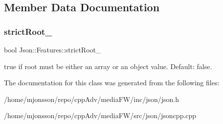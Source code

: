 \subsection{Member Data Documentation}
\mbox{\label{classJson_1_1Features_a1162c37a1458adc32582b585b552f9c3}} 
\subsubsection{\texorpdfstring{strict\+Root\+\_\+}{strictRoot\_}}
{\footnotesize\ttfamily bool Json\+::\+Features\+::strict\+Root\+\_\+}

{\ttfamily true} if root must be either an array or an object value. Default\+: {\ttfamily false}. 

The documentation for this class was generated from the following files\+:\begin{DoxyCompactItemize}
\item 
/home/mjonsson/repo/cpp\+Adv/media\+F\+W/inc/json/json.\+h\item 
/home/mjonsson/repo/cpp\+Adv/media\+F\+W/src/json/jsoncpp.\+cpp\end{DoxyCompactItemize}
